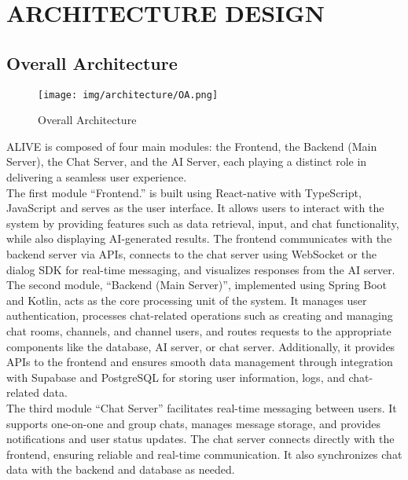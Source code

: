 \documentclass[conference]{IEEEtran}
\begin{document}
\section{ARCHITECTURE DESIGN}
\subsection{Overall Architecture}

\begin{figure}[h]
\centering   
\texttt{[image: img/architecture/OA.png]}
\caption{Overall Architecture}
\end{figure}

\hspace{0.7em} ALIVE is composed of four main modules: the Frontend, the Backend (Main Server), the Chat Server, and the AI Server, each playing a distinct role in delivering a seamless user experience. \\

\hspace{0.7em} The first module “Frontend.”  is built using React-native with TypeScript, JavaScript and serves as the user interface. It allows users to interact with the system by providing features such as data retrieval, input, and chat functionality, while also displaying AI-generated results. The frontend communicates with the backend server via APIs, connects to the chat server using WebSocket or the dialog SDK for real-time messaging, and visualizes responses from the AI server. \\


\hspace{0.7em} The second module, “Backend (Main Server)”, implemented using Spring Boot and Kotlin, acts as the core processing unit of the system. It manages user authentication, processes chat-related operations such as creating and managing chat rooms, channels, and channel users, and routes requests to the appropriate components like the database, AI server, or chat server. Additionally, it provides APIs to the frontend and ensures smooth data management through integration with Supabase and PostgreSQL for storing user information, logs, and chat-related data. \\

\hspace{0.7em} The third module “Chat Server” facilitates real-time messaging between users. It supports one-on-one and group chats, manages message storage, and provides notifications and user status updates. The chat server connects directly with the frontend, ensuring reliable and real-time communication. It also synchronizes chat data with the backend and database as needed. \\ 
\end{document}
